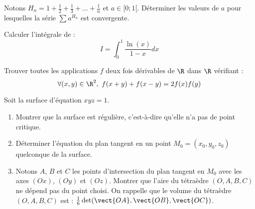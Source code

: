 \documentclass[french,11pt,twoside]{VcCours}
\begin{document}
\begin{Exercice}
  Notons $H_n=1+\frac12+\frac13+\ldots+\frac1n$ et $a\in[0;1[$. 
  Déterminer les valeurs de $a$ pour lesquelles la série $\sum a^{H_n}$ est convergente.
\end{Exercice}


\begin{Exercice}
  Calculer l'intégrale de :
  \[I=\int_0^1\frac{\ln(x)}{1-x}dx\]
\end{Exercice}




\begin{Exercice}
  Trouver toutes les applications $f$ deux fois dérivables de $\R$ dans $\R$ vérifiant :
  \[\forall(x,y)\in\R^2,\ f(x+y)+f(x-y)=2f(x)f(y)\]
\end{Exercice}

\begin{Exercice}
Soit la surface d'équation $xyz = 1$.
\begin{enumerate}
  \item Montrer que la surface est régulière, c'est-à-dire qu'elle n'a pas de point critique.
  \item Déterminer l'équation du plan tangent en un point $M_0 = (x_0,y_0,z_0)$ quelconque de la surface.
  \item Notons $A$, $B$ et $C$ les points d'intersection du plan tangent en $M_0$ avec les axes $(Ox)$, $(Oy)$ et $(Oz)$. Montrer que
l'aire du tétraèdre $(O,A,B,C)$ ne dépend pas du point choisi. On rappelle que le volume du tétraèdre $(O,A,B,C)$
est : $\frac16\det(\vect{OA},\vect{OB},\vect{OC})$.
\end{enumerate}
\end{Exercice}
\end{document}
